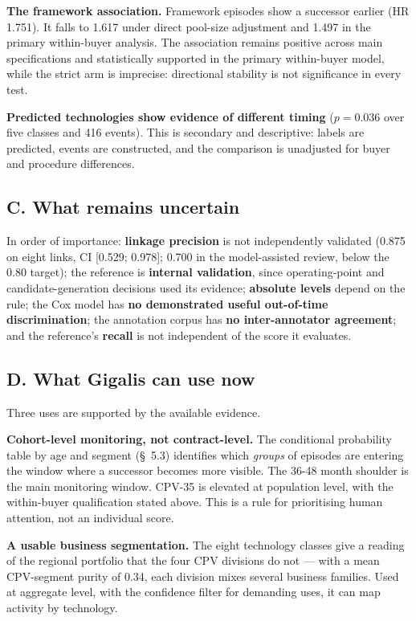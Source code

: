 \textbf{The framework association.} Framework episodes show a successor earlier (HR 1.751). It falls to 1.617 under direct pool-size adjustment and 1.497 in the primary within-buyer analysis. The association remains positive across main specifications and statistically supported in the primary within-buyer model, while the strict arm is imprecise: directional stability is not significance in every test.

\textbf{Predicted technologies show evidence of different timing} (\(p = 0.036\) over five classes and 416 events). This is secondary and descriptive: labels are predicted, events are constructed, and the comparison is unadjusted for buyer and procedure differences.

\subsection{C. What remains uncertain}

In order of importance: \textbf{linkage precision} is not independently validated (0.875 on eight links, CI {[}0.529; 0.978{]}; 0.700 in the model-assisted review, below the 0.80 target); the reference is \textbf{internal validation}, since operating-point and candidate-generation decisions used its evidence; \textbf{absolute levels} depend on the rule; the Cox model has \textbf{no demonstrated useful out-of-time discrimination}; the annotation corpus has \textbf{no inter-annotator agreement}; and the reference's \textbf{recall} is not independent of the score it evaluates.

\subsection{D. What Gigalis can use now}

Three uses are supported by the available evidence.

\textbf{Cohort-level monitoring, not contract-level.} The conditional probability table by age and segment (\S~5.3) identifies which \emph{groups} of episodes are entering the window where a successor becomes more visible. The 36-48 month shoulder is the main monitoring window. CPV-35 is elevated at population level, with the within-buyer qualification stated above. This is a rule for prioritising human attention, not an individual score.

\textbf{A usable business segmentation.} The eight technology classes give a reading of the regional portfolio that the four CPV divisions do not --- with a mean CPV-segment purity of 0.34, each division mixes several business families. Used at aggregate level, with the confidence filter for demanding uses, it can map activity by technology.

